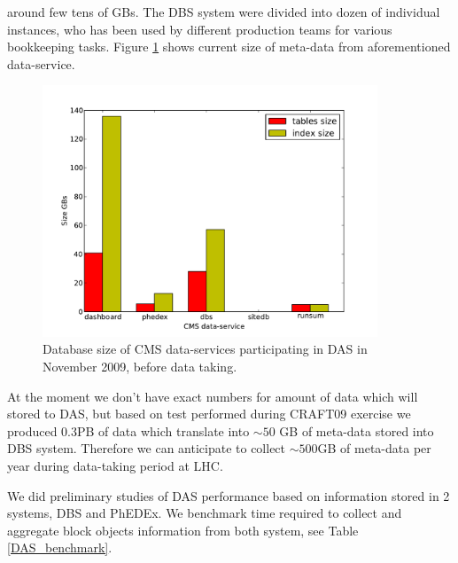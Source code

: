 \documentclass[a4paper]{jpconf}
\begin{document}
around few tens of GBs. The DBS system were divided into dozen of individual instances, 
who has been used by different production teams for various bookkeeping tasks.
Figure \ref{db_size} shows current size of meta-data from aforementioned data-service.
\begin{figure}[htb]
\centering
\includegraphics[width=100mm]{db_size.pdf}
\caption{
Database size of CMS data-services participating in DAS in November 2009, before
data taking.
}
\label{db_size}
\end{figure}

At the moment we don't have exact numbers for amount of data which will stored to DAS,
but based on test performed during CRAFT09 \cite{CRAFT09}
exercise we produced 0.3PB of data which
translate into $\sim50$ GB of meta-data stored into DBS system. Therefore
we can anticipate to collect $\sim500$GB of meta-data per year during data-taking period
at LHC.

We did preliminary studies of DAS performance based on information stored
in 2 systems, DBS and PhEDEx. We benchmark time required to collect and 
aggregate block objects information from both system, see Table \ref{DAS_benchmark}.
\end{document}
